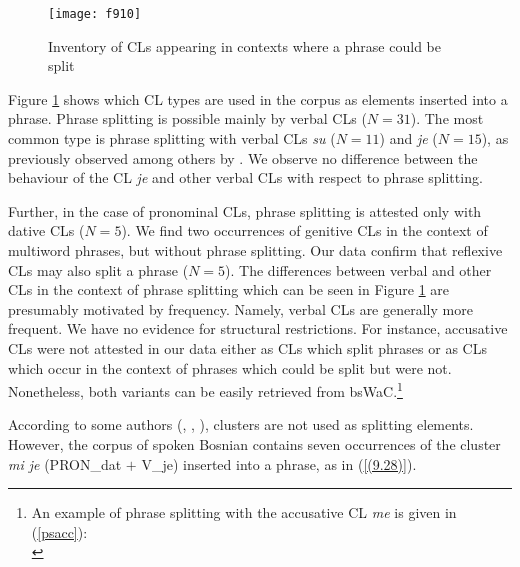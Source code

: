 \begin{figure}
\caption{Inventory of CLs appearing in contexts where a phrase could be split}
\label{F.9.10}
\texttt{[image: f910]}
\end{figure}

Figure \ref{F.9.10} shows which CL types are used in the corpus as elements inserted into a phrase. Phrase splitting is possible mainly by verbal CLs ($N=31$). The most common type is phrase splitting with verbal CLs \textit{su} ($N=11$) and \textit{je} ($N=15$), as previously observed among others by \citet[174f]{PetiStantic02}. We observe no difference between the behaviour of the CL \textit{je} and other verbal CLs with respect to phrase splitting.

Further, in the case of pronominal CLs, phrase splitting is attested only with dative CLs ($N=5$). We find two occurrences of genitive CLs in the context of multiword phrases, but without phrase splitting. Our data confirm that reflexive CLs may also split a phrase ($N=5$). The differences between verbal and other CLs in the context of phrase splitting which can be seen in Figure \ref{F.9.10} are presumably motivated by frequency. Namely, verbal CLs are generally more frequent. We have no evidence for structural restrictions. For instance, accusative CLs were not attested in our data either as CLs which split phrases or as CLs which occur in the context of phrases which could be split but were not. Nonetheless, both variants can be easily retrieved from bsWaC.\footnote{An example of phrase splitting with the accusative CL \textit{me} is given in (\ref{psacc}): \\
    }

According to some authors (\citealt[e.g.][]{Progovac96}, \citealt{RadanovicKocic88}, \citeyear{RadanovicKocic96}), clusters are not used as splitting elements. However, the corpus of spoken Bosnian contains seven occurrences of the cluster \textit{mi je} (PRON\_dat $+$ V\_je) inserted into a phrase, as in (\ref{(9.28)}). 

